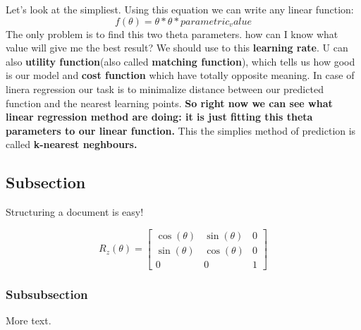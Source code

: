 \documentclass{article}
\begin{document}
  Let's look at the simpliest. Using this equation we can write any linear function:
  \begin{equation*}
    f(\theta) = \theta * \theta * parametric_value
  \end{equation*}
  The only problem is to find this two theta parameters. how can I know what value will give me the best result? We should use to this \textbf{learning rate}. U can also \textbf{utility function}(also called \textbf{matching function}), which tells us how good is our model and \textbf{cost function} which have totally opposite meaning. In case of linera regression our task is to minimalize distance between our predicted function and the nearest learning points. \textbf{So right now we can see what linear regression method are doing: it is just fitting this theta parameters to our linear function.} This the simplies method of prediction is called \textbf{k-nearest neghbours.}
    \newpage

\subsection{Subsection}
































Structuring a document is easy!

\[    %
R_z (\theta)=
\begin{bmatrix}
    \cos(\theta) & \sin(\theta)  & 0 \\
    \sin(\theta) &  \cos(\theta)  & 0 \\
    0            & 0             & 1
\end{bmatrix}
\]    %

\subsubsection{Subsubsection}

More text.
\end{document}
